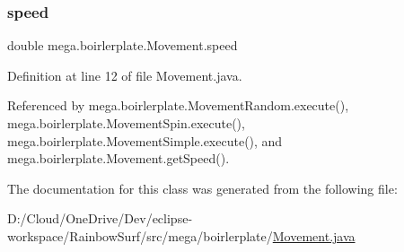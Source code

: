\mbox{\label{classmega_1_1boirlerplate_1_1_movement_ad69a2251b52e302bb9c17607903b3e7d}} 
\subsubsection{\texorpdfstring{speed}{speed}}
{\footnotesize\ttfamily double mega.\+boirlerplate.\+Movement.\+speed\hspace{0.3cm}{\ttfamily [protected]}}



Definition at line 12 of file Movement.\+java.



Referenced by mega.\+boirlerplate.\+Movement\+Random.\+execute(), mega.\+boirlerplate.\+Movement\+Spin.\+execute(), mega.\+boirlerplate.\+Movement\+Simple.\+execute(), and mega.\+boirlerplate.\+Movement.\+get\+Speed().



The documentation for this class was generated from the following file\+:\begin{DoxyCompactItemize}
\item 
D\+:/\+Cloud/\+One\+Drive/\+Dev/eclipse-\/workspace/\+Rainbow\+Surf/src/mega/boirlerplate/\hyperlink{_movement_8java}{Movement.\+java}\end{DoxyCompactItemize}
